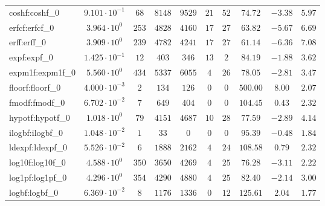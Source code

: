 \begin{tabular}{|l|c|c|c|c|c|c|c|c|c|}
coshf:coshf\_0               & $ 9.101 \cdot 10^{-1} $ & $ 68     $ & $ 8148   $ & $ 9529   $ & $ 21  $ & $ 52  $ & $ 74.72       $ & $ -3.38   $ & $ 5.97    $ \\
erfcf:erfcf\_0               & $ 3.964 \cdot 10^{0}  $ & $ 253    $ & $ 4828   $ & $ 4160   $ & $ 17  $ & $ 27  $ & $ 63.82       $ & $ -5.67   $ & $ 6.69    $ \\
erff:erff\_0                 & $ 3.909 \cdot 10^{0}  $ & $ 239    $ & $ 4782   $ & $ 4241   $ & $ 17  $ & $ 27  $ & $ 61.14       $ & $ -6.36   $ & $ 7.08    $ \\
expf:expf\_0                 & $ 1.425 \cdot 10^{-1} $ & $ 12     $ & $ 403    $ & $ 346    $ & $ 13  $ & $ 2   $ & $ 84.19       $ & $ -1.88   $ & $ 3.62    $ \\
expm1f:expm1f\_0             & $ 5.560 \cdot 10^{0}  $ & $ 434    $ & $ 5337   $ & $ 6055   $ & $ 4   $ & $ 26  $ & $ 78.05       $ & $ -2.81   $ & $ 3.47    $ \\
floorf:floorf\_0             & $ 4.000 \cdot 10^{-3} $ & $ 2      $ & $ 134    $ & $ 126    $ & $ 0   $ & $ 0   $ & $ 500.00      $ & $ 8.00    $ & $ 2.07    $ \\
fmodf:fmodf\_0               & $ 6.702 \cdot 10^{-2} $ & $ 7      $ & $ 649    $ & $ 404    $ & $ 0   $ & $ 0   $ & $ 104.45      $ & $ 0.43    $ & $ 2.32    $ \\
hypotf:hypotf\_0             & $ 1.018 \cdot 10^{0}  $ & $ 79     $ & $ 4151   $ & $ 4687   $ & $ 10  $ & $ 28  $ & $ 77.59       $ & $ -2.89   $ & $ 4.14    $ \\
ilogbf:ilogbf\_0             & $ 1.048 \cdot 10^{-2} $ & $ 1      $ & $ 33     $ & $ 0      $ & $ 0   $ & $ 0   $ & $ 95.39       $ & $ -0.48   $ & $ 1.84    $ \\
ldexpf:ldexpf\_0             & $ 5.526 \cdot 10^{-2} $ & $ 6      $ & $ 1888   $ & $ 2162   $ & $ 4   $ & $ 24  $ & $ 108.58      $ & $ 0.79    $ & $ 2.32    $ \\
log10f:log10f\_0             & $ 4.588 \cdot 10^{0}  $ & $ 350    $ & $ 3650   $ & $ 4269   $ & $ 4   $ & $ 25  $ & $ 76.28       $ & $ -3.11   $ & $ 2.22    $ \\
log1pf:log1pf\_0             & $ 4.296 \cdot 10^{0}  $ & $ 354    $ & $ 4290   $ & $ 4880   $ & $ 4   $ & $ 25  $ & $ 82.40       $ & $ -2.14   $ & $ 3.00    $ \\
logbf:logbf\_0               & $ 6.369 \cdot 10^{-2} $ & $ 8      $ & $ 1176   $ & $ 1336   $ & $ 0   $ & $ 12  $ & $ 125.61      $ & $ 2.04    $ & $ 1.77    $ \\

\end{tabular}
